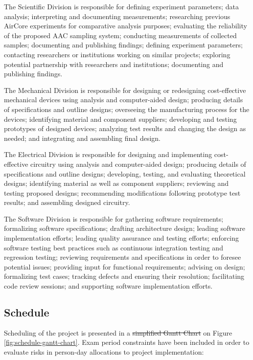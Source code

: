 \documentclass[a4paper,12pt,twoside]{article}
\providecommand{\DIFaddtex}[1]{{\protect\color{blue}\uwave{#1}}} %
\providecommand{\DIFdeltex}[1]{{\protect\color{red}\sout{#1}}}                      %
\providecommand{\DIFaddbegin}{} %
\providecommand{\DIFaddend}{} %
\providecommand{\DIFdelbegin}{} %
\providecommand{\DIFdelend}{} %
\providecommand{\DIFadd}[1]{\texorpdfstring{\DIFaddtex{#1}}{#1}} %
\providecommand{\DIFdel}[1]{\texorpdfstring{\DIFdeltex{#1}}{}} %
\newcommand{\DIFscaledelfig}{0.5}
\newlength{\DIFdelgraphicswidth} %
\newlength{\DIFdelgraphicsheight} %
\newcommand{\DIFaddincludegraphics}[2][]{{\color{blue}\fbox{\DIFOincludegraphics[#1]{#2}}}} %
\newcommand{\DIFdelincludegraphics}[2][]{%
\sbox{\DIFdelgraphicsbox}{\DIFOincludegraphics[#1]{#2}}%
\settoboxwidth{\DIFdelgraphicswidth}{\DIFdelgraphicsbox} %
\settoboxtotalheight{\DIFdelgraphicsheight}{\DIFdelgraphicsbox} %
\scalebox{\DIFscaledelfig}{%
\parbox[b]{\DIFdelgraphicswidth}{\usebox{\DIFdelgraphicsbox}\\[-\baselineskip] \rule{\DIFdelgraphicswidth}{0em}}\llap{\resizebox{\DIFdelgraphicswidth}{\DIFdelgraphicsheight}{%
\setlength{\unitlength}{\DIFdelgraphicswidth}%
\begin{picture}(1,1)%
\thicklines\linethickness{2pt} %
{\color[rgb]{1,0,0}\put(0,0){\framebox(1,1){}}}%
{\color[rgb]{1,0,0}\put(0,0){\line( 1,1){1}}}%
{\color[rgb]{1,0,0}\put(0,1){\line(1,-1){1}}}%
\end{picture}%
}\hspace*{3pt}}} %
} %
\DeclareRobustCommand{\DIFaddbegin}{\DIFOaddbegin \let\includegraphics\DIFaddincludegraphics} %
\DeclareRobustCommand{\DIFaddend}{\DIFOaddend \let\includegraphics\DIFOincludegraphics} %
\DeclareRobustCommand{\DIFdelbegin}{\DIFOdelbegin \let\includegraphics\DIFdelincludegraphics} %
\DeclareRobustCommand{\DIFdelend}{\DIFOaddend \let\includegraphics\DIFOincludegraphics} %
\begin{document}
The Scientific Division is responsible for defining experiment parameters; data analysis; interpreting and documenting measurements; researching previous AirCore experiments for comparative analysis purposes; evaluating the reliability of the proposed AAC sampling system; conducting measurements of collected samples; documenting and publishing findings; defining experiment parameters; contacting researchers or institutions working on similar projects; exploring potential partnership with researchers and institutions; documenting and publishing findings.

The Mechanical Division is responsible for designing or redesigning cost-effective mechanical devices using analysis and computer-aided design; producing details of specifications and outline designs; overseeing the manufacturing process for the devices; identifying material and component suppliers; developing and testing prototypes of designed devices; analyzing test results and changing the design as needed; and integrating and assembling final design.

The Electrical Division is responsible for designing and implementing cost-effective circuitry using analysis and computer-aided design; producing details of specifications and outline designs; developing, testing, and evaluating theoretical designs; identifying material as well as component suppliers; reviewing and testing proposed designs; recommending modifications following prototype test results; and assembling designed circuitry.

The Software Division is responsible for gathering software requirements; formalizing software specifications; drafting architecture design; leading software implementation efforts; leading quality assurance and testing efforts; enforcing software testing best practices such as continuous integration testing and regression testing; reviewing requirements and specifications in order to foresee potential issues; providing input for functional requirements; advising on design; formalizing test cases; tracking defects and ensuring their resolution; facilitating code review sessions; and supporting software implementation efforts.
\pagebreak
\subsection{Schedule}

Scheduling of the project is presented in a \DIFdelbegin \DIFdel{simplified Gantt Chart }\DIFdelend \DIFaddbegin \DIFadd{Gantt Chart overview }\DIFaddend on Figure \ref{fig:schedule-gantt-chart}. Exam period constraints have been included in order to evaluate risks in person-day allocations to project implementation:
\end{document}
